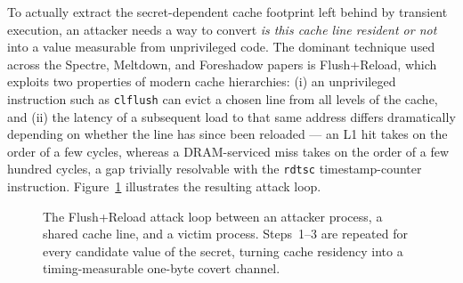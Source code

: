 \documentclass[11pt,a4paper]{article}
\begin{document}
To actually extract the secret-dependent cache footprint left behind by
transient execution, an attacker needs a way to convert \emph{is this cache
line resident or not} into a value measurable from unprivileged code. The
dominant technique used across the Spectre, Meltdown, and Foreshadow papers is
Flush+Reload, which exploits two properties of modern cache hierarchies: (i) an
unprivileged instruction such as \texttt{clflush} can evict a chosen line from
all levels of the cache, and (ii) the latency of a subsequent load to that same
address differs dramatically depending on whether the line has since been
reloaded --- an L1 hit takes on the order of a few cycles, whereas a DRAM-serviced
miss takes on the order of a few hundred cycles, a gap trivially resolvable with
the \texttt{rdtsc} timestamp-counter instruction. Figure~\ref{fig:flushreload}
illustrates the resulting attack loop.

\begin{figure}[h]
\centering
{}
\caption{The Flush+Reload attack loop between an attacker process, a shared
cache line, and a victim process. Steps~1--3 are repeated for every candidate
value of the secret, turning cache residency into a timing-measurable
one-byte covert channel.}
\label{fig:flushreload}
\end{figure}
\end{document}
